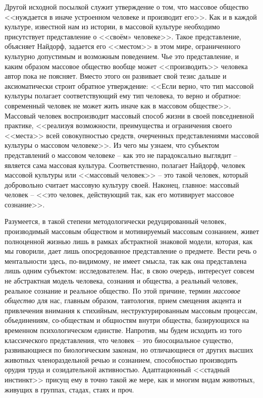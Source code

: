 Другой исходной посылкой служит утверждение о том, что массовое общество <<нуждается в иначе устроенном
человеке и производит его>>. Как и в каждой культуре, известной нам из истории, в
массовой культуре необходимо присутствует представление о <<своём» человеке>>\autocite{ocherki}. Такое представление,
объясняет Найдорф, задается его <<местом>> в этом мире, ограниченного культурно допустимым и возможным поведением\autocite{naydof}.
Чье это представление, и каким образом массовое общество вообще может <<производить>>
человека автор пока не поясняет. Вместо этого он развивает свой тезис дальше и аксиоматически
строит обратное утверждение: <<Если верно, что тип массовой культуры полагает соответствующий ему тип человека,
то верно и обратное: современный человек не может жить иначе как в массовом обществе>>\autocite{ocherki}.
Массовый человек воспроизводит массовый способ жизни в своей повседневной практике, <<реализуя возможности,
преимущества и ограничения своего <<места>> всей совокупностью средств, очерченных представлениями массовой
культуры о массовом человеке>>\autocite{ocherki}. Из чего мы узнаем, что субъектом представлений о массовом человеке --
как это не парадоксально выглядит -- является сама массовая культура. Соответственно, полагает Найдорф,
человек массовой культуры или <<массовый человек>> -- это такой человек, который добровольно считает
массовую культуру своей. Наконец, главное: массовый человек -- <<это человек, действующий так, как его
мотивирует массовое сознание>>\autocite{ocherki}.

Разумеется, в такой степени методологически редуцированный человек, производимый массовым обществом и
мотивируемый массовым сознанием, живет полноценной жизнью лишь в рамках абстрактной знаковой модели,
которая, как мы говорили, дает лишь опосредованное представление о предмете. Вести речь о ментальности
здесь, по-видимому, не имеет смысла, так как она представлена лишь одним субъектом: исследователем.
Нас, в свою очередь, интересует совсем не абстрактная модель человека, сознания и общества, а реальный человек,
реальное сознание и реальное общество. По этой причине, термин \emph{массовое общество} для нас, главным образом,
тавтология, прием смещения акцента и привлечения внимания к стихийным, неструктурированным массовым процессам,
объединениям, со-обществам и общностям внутри общества, базирующихся на временном психологическом единстве.
Напротив, мы будем исходить из того классического представления, что человек -- это биосоциальное существо,
развивающиеся по биологическим законам, но отличающиеся от других высших животных членораздельной речью и
сознанием, способностью производить орудия труда и созидательной активностью. Адаптационный <<стадный инстинкт>>
присущ ему в точно такой же мере, как и многим видам животных, живущих в группах, стадах, стаях и проч.

